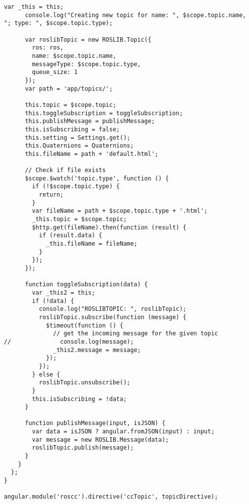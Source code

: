 \begin{lstlisting}[breaklines=true,basicstyle=\tiny]
      var _this = this;
      console.log("Creating new topic for name: ", $scope.topic.name, "; type: ", $scope.topic.type);

      var roslibTopic = new ROSLIB.Topic({
        ros: ros,
        name: $scope.topic.name,
        messageType: $scope.topic.type,
        queue_size: 1
      });
      var path = 'app/topics/';

      this.topic = $scope.topic;
      this.toggleSubscription = toggleSubscription;
      this.publishMessage = publishMessage;
      this.isSubscribing = false;
      this.setting = Settings.get();
      this.Quaternions = Quaternions;
      this.fileName = path + 'default.html';

      // Check if file exists
      $scope.$watch('topic.type', function () {
        if (!$scope.topic.type) {
          return;
        }
        var fileName = path + $scope.topic.type + '.html';
        _this.topic = $scope.topic;
        $http.get(fileName).then(function (result) {
          if (result.data) {
            _this.fileName = fileName;
          }
        });
      });

      function toggleSubscription(data) {
        var _this2 = this;
        if (!data) {
          console.log("ROSLIBTOPIC: ", roslibTopic);
          roslibTopic.subscribe(function (message) {
            $timeout(function () {
              // get the incoming message for the given topic
//              console.log(message);
              _this2.message = message;
            });
          });
        } else {
          roslibTopic.unsubscribe();
        }
        this.isSubscribing = !data;
      }

      function publishMessage(input, isJSON) {
        var data = isJSON ? angular.fromJSON(input) : input;
        var message = new ROSLIB.Message(data);
        roslibTopic.publish(message);
      }
    }
  };
}

angular.module('roscc').directive('ccTopic', topicDirective);



\end{lstlisting}
